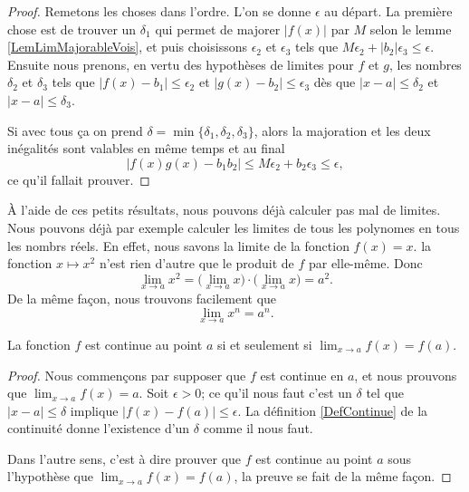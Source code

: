 \begin{proof}
    Remetons les choses dans l'ordre. L'on se donne $\epsilon$ au départ. La première chose est de trouver un $\delta_1$ qui permet de majorer $|f(x)|$ par $M$ selon le lemme \ref{LemLimMajorableVois}, et puis choisissons $\epsilon_2$ et $\epsilon_3$ tels que $M\epsilon_2+| b_2 |\epsilon_3\leq\epsilon$. Ensuite nous prenons, en vertu des hypothèses de limites pour $f$ et $g$, les nombres $\delta_2$ et $\delta_3$ tels que $| f(x)-b_1 |\leq \epsilon_2$ et $| g(x)-b_2 |\leq \epsilon_3$ dès que $| x-a |\leq \delta_2$ et $| x-a |\leq \delta_3$.

    Si avec tous ça on prend $\delta=\min\{ \delta_1,\delta_2,\delta_3 \}$, alors la majoration et les deux inégalités sont valables en même temps et au final
    \[ 
      | f(x)g(x)-b_1b_2 |\leq M\epsilon_2+b_2\epsilon_3\leq \epsilon,
    \]
    ce qu'il fallait prouver.

\end{proof}

À l'aide de ces petits résultats, nous pouvons déjà calculer pas mal de limites. Nous pouvons déjà par exemple calculer les limites de tous les polynomes en tous les nombrs réels. En effet, nous savons la limite de la fonction $f(x)=x$. la fonction $x\mapsto x^2$ n'est rien d'autre que le produit de $f$ par elle-même. Donc
\[ 
  \lim_{x\to a}x^2=\big( \lim_{x\to a}x\big)\cdot\big( \lim_{x\to a}x \big)=a^2.
\]
De la même façon, nous trouvons facilement que 
\begin{equation}
 \lim_{x\to a}x^n=a^n.
\end{equation}

\begin{theorem}           \label{ThoLimCont}
La fonction $f$ est continue au point $a$ si et seulement si $\lim_{x\to a}f(x)=f(a)$.
\end{theorem}

\begin{proof}
Nous commençons par supposer que $f$ est continue en $a$, et nous prouvons que $\lim_{x\to a}f(x)=a$. Soit $\epsilon>0$; ce qu'il nous faut c'est un $\delta$ tel que $| x-a |\leq\delta$ implique $| f(x)-f(a) |\leq\epsilon$. La définition \ref{DefContinue} de la continuité donne l'existence d'un $\delta$ comme il nous faut.

Dans l'autre sens, c'est à dire prouver que $f$ est continue au point $a$ sous l'hypothèse que $\lim_{x\to a}f(x)=f(a)$, la preuve se fait de la même façon.
\end{proof}

